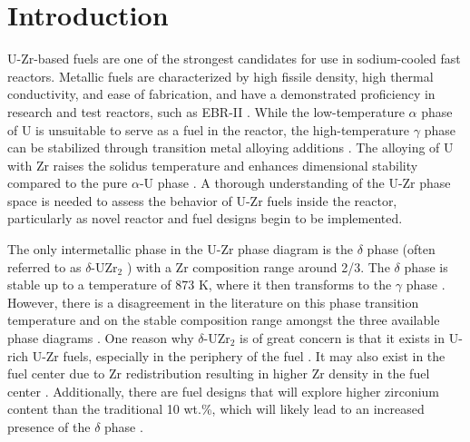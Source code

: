 \documentclass[preprint,12pt]{elsarticle}
\begin{document}
\section{Introduction}
\label{sec:sample1}
U-Zr-based fuels are one of the strongest candidates for use in sodium-cooled fast reactors. Metallic fuels are characterized by high fissile density, high thermal conductivity, and ease of fabrication, and have a demonstrated proficiency in research and test reactors, such as EBR-II  \cite{walters_thirty_1999,mariani_metallic_2012}. While the low-temperature $\alpha$ phase of U is unsuitable to serve as a fuel in the reactor, the high-temperature $\gamma$ phase can be stabilized through transition metal alloying additions  \cite{kaity_microstructural_2012, ghoshal_microstructural_2014}. 
The alloying of U with Zr raises the solidus temperature and enhances dimensional stability compared to the pure $\alpha$-U phase  \cite{park_anisotropic_2019}. A thorough understanding of the U-Zr phase space is needed to assess the behavior of U-Zr fuels inside the reactor, particularly as novel reactor and fuel designs begin to be implemented. 


The only intermetallic phase in the U-Zr phase diagram is the $\delta$ phase (often referred to as $\delta$-UZr$_{2}$ \cite{sheldon_u-zr_1989}) with a Zr composition range around 2/3. The $\delta$ phase is stable up to a temperature of 873 K, where it then transforms to the $\gamma$ phase  \cite{rough_constitution_1958}. However, there is a disagreement in the literature on this phase transition temperature and on the stable composition range amongst the three available phase diagrams  \cite{rough_constitution_1958, sheldon_u-zr_1989, akabori_stability_1992}. One reason why $\delta$-UZr$_{2}$ is of great concern is that it exists in U-rich U-Zr fuels, especially in the periphery of the fuel  \cite{ahn_microstructure_2016}. It may also exist in the fuel center due to Zr redistribution resulting in higher Zr density in the fuel center  \cite{harp_postirradiation_2018}. Additionally, there are fuel designs that will explore higher zirconium content than the traditional 10 wt.\%, which will likely lead to an increased presence of the $\delta$ phase  \cite{malone_lightbridge_2012}.
\end{document}
